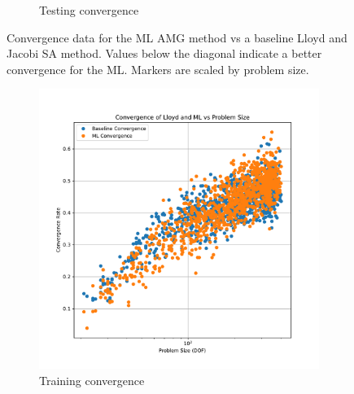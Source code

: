 \documentclass{article}
\begin{document}
\begin{figure}[h]
\begin{subfigure}[t]{0.49\textwidth}
    \caption{Testing convergence}
  \end{subfigure}
  \caption{Convergence data for the ML AMG method vs a baseline Lloyd and Jacobi SA method.  Values below the diagonal indicate a better convergence for the ML.  Markers are scaled by problem size.}
  \label{fig:conv}
\end{figure}

\begin{figure}[h]
  \centering
  \begin{subfigure}[t]{0.49\textwidth}
    \centering
    \includegraphics[width=\textwidth]{train_convergence_per_size.pdf}
    \caption{Training convergence}
  \end{subfigure}
  \begin{subfigure}[t]{0.49\textwidth}
    \centering

\end{subfigure}
\end{figure}
\end{document}
